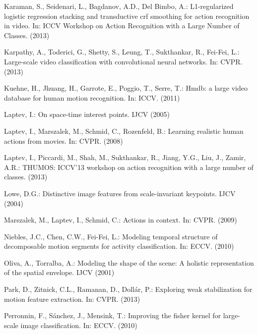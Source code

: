 \documentclass[runningheads]{llncs}
\begin{document}
\begin{thebibliography}{10}
Karaman, S., Seidenari, L., Bagdanov, A.D., Del Bimbo, A.:
\newblock L1-regularized logistic regression stacking and transductive crf smoothing for action recognition in video.
\newblock In: ICCV Workshop on Action Recognition with a Large Number of Classes.
\newblock (2013)

Karpathy, A., Toderici, G., Shetty, S., Leung, T., Sukthankar, R., Fei-Fei, L.:
\newblock Large-scale video classification with convolutional neural networks.
\newblock In: CVPR.
\newblock (2013)

Kuehne, H., Jhuang, H., Garrote, E., Poggio, T., Serre, T.:
\newblock Hmdb: a large video database for human motion recognition.
\newblock In: ICCV. (2011)

Laptev, I.:
\newblock On space-time interest points.
\newblock IJCV (2005)

Laptev, I., Marszalek, M., Schmid, C., Rozenfeld, B.:
\newblock Learning realistic human actions from movies.
\newblock In: CVPR. (2008)

Laptev, I., Piccardi, M., Shah, M., Sukthankar, R., Jiang, Y.G., Liu, J., Zamir, A.R.:
\newblock THUMOS: ICCV'13 workshop on action recognition with a large number of classes.
\newblock (2013)

Lowe, D.G.:
\newblock Distinctive image features from scale-invariant keypoints.
\newblock IJCV (2004)

Marszalek, M., Laptev, I., Schmid, C.:
\newblock Actions in context.
\newblock In: CVPR. (2009)

Niebles, J.C., Chen, C.W., Fei-Fei, L.:
\newblock Modeling temporal structure of decomposable motion segments for
  activity classification.
\newblock In: ECCV.
\newblock (2010)

Oliva, A., Torralba, A.:
\newblock Modeling the shape of the scene: A holistic representation of the
  spatial envelope.
\newblock IJCV (2001)

Park, D., Zitnick, C.L., Ramanan, D., Doll{\'a}r, P.:
\newblock Exploring weak stabilization for motion feature extraction.
\newblock In: CVPR. (2013)

Perronnin, F., S{\'a}nchez, J., Mensink, T.:
\newblock Improving the fisher kernel for large-scale image classification.
\newblock In: ECCV.
\newblock (2010)


\end{thebibliography}
\end{document}
